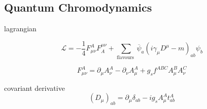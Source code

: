 \subsection{Quantum Chromodynamics}\label{secQCD}


lagrangian

\begin{equation}
\mathcal{L}=-\frac{1}{4} F_{\mu \nu}^{A} F_{A}^{\mu \nu}+\sum_{\text {flavours }} \overline{\psi}_{a}\left(i \gamma_{\mu} D^{\mu}-m\right)_{a b} \psi_{b}
\end{equation}

\begin{equation}
F_{\mu \nu}^{A}=\partial_{\mu} A_{\nu}^{A}-\partial_{\nu} A_{\mu}^{A}+g_{s} f^{A B C} A_{\mu}^{B} A_{\nu}^{C}
\end{equation}

covariant derivative
\begin{equation}
\left(D_{\mu}\right)_{a b}=\partial_{\mu} \delta_{a b}-i g_{s} A_{\mu}^{A} t_{a b}^{A}
\end{equation}















